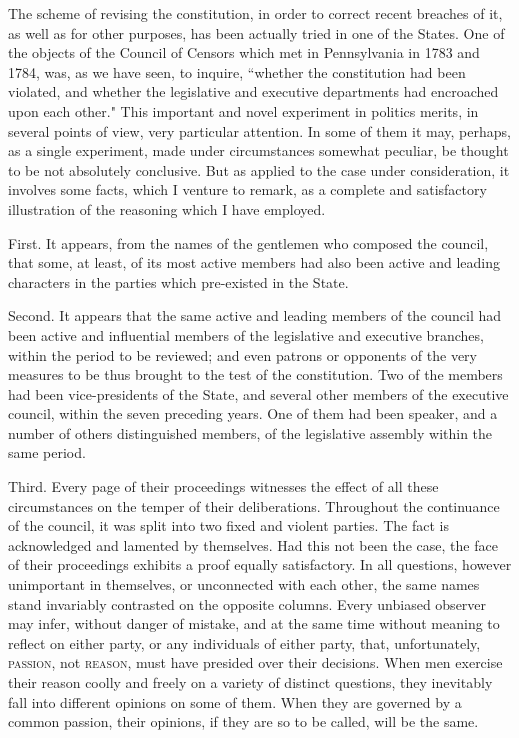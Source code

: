 The scheme of revising the constitution, in order to correct recent breaches of it, as well as for other purposes, has been actually tried in one of the States. 
One of the objects of the Council of Censors which met in Pennsylvania in 1783 and 1784, was, as we have seen, to inquire, ``whether the constitution had been violated, and whether the legislative and executive departments had encroached upon each other." This important and novel experiment in politics merits, in several points of view, very particular attention. 
In some of them it may, perhaps, as a single experiment, made under circumstances somewhat peculiar, be thought to be not absolutely conclusive. 
But as applied to the case under consideration, it involves some facts, which I venture to remark, as a complete and satisfactory illustration of the reasoning which I have employed.

First. 
It appears, from the names of the gentlemen who composed the council, that some, at least, of its most active members had also been active and leading characters in the parties which pre-existed in the State.

Second. 
It appears that the same active and leading members of the council had been active and influential members of the legislative and executive branches, within the period to be reviewed; and even patrons or opponents of the very measures to be thus brought to the test of the constitution. 
Two of the members had been vice-presidents of the State, and several other members of the executive council, within the seven preceding years. 
One of them had been speaker, and a number of others distinguished members, of the legislative assembly within the same period.

Third. 
Every page of their proceedings witnesses the effect of all these circumstances on the temper of their deliberations. 
Throughout the continuance of the council, it was split into two fixed and violent parties. 
The fact is acknowledged and lamented by themselves. 
Had this not been the case, the face of their proceedings exhibits a proof equally satisfactory. 
In all questions, however unimportant in themselves, or unconnected with each other, the same names stand invariably contrasted on the opposite columns. 
Every unbiased observer may infer, without danger of mistake, and at the same time without meaning to reflect on either party, or any individuals of either party, that, unfortunately, \textsc{passion}, not \textsc{reason}, must have presided over their decisions. 
When men exercise their reason coolly and freely on a variety of distinct questions, they inevitably fall into different opinions on some of them. 
When they are governed by a common passion, their opinions, if they are so to be called, will be the same.

